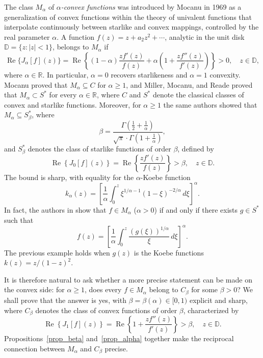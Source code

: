 \documentclass[reqno]{amsart}
\theoremstyle{plain}
\theoremstyle{definition}
\begin{document}
The class $M_\alpha$ of \textit{$\alpha$-convex functions} was introduced by Mocanu \cite{Moc1969} in 1969 as a generalization of convex functions within the theory of univalent functions that interpolate continuously between starlike and convex mappings, controlled by the real parameter $\alpha$. A function $f(z) = z + a_2z^2 + \cdots$, analytic in the unit disk $\mathbb{D} = \{z : |z| < 1\}$, belongs to $M_\alpha$ if
\begin{equation}\label{eq:a-convex}
\operatorname{Re}\{J_\alpha[f](z)\} = \operatorname{Re}\left\{(1-\alpha)\frac{zf'(z)}{f(z)} + \alpha\left(1 + \frac{zf''(z)}{f'(z)}\right)\right\} > 0, \quad z \in \mathbb{D},
\end{equation}
where $\alpha \in \mathbb{R}$. In particular, $\alpha = 0$ recovers starlikeness and $\alpha = 1$ convexity. Mocanu proved that $M_\alpha \subseteq C$ for $\alpha \geq 1$, and Miller, Mocanu, and Reade \cite{MMR1978} proved that $M_\alpha \subset S^*$ for every $\alpha \in \mathbb{R}$, where $C$ and $S^*$ denote the classical classes of
convex and starlike functions. Moreover, for $\alpha \geq 1$ the same authors showed that $M_\alpha \subseteq S^*_\beta$, where
\[\beta = \frac{\Gamma\!\left(\frac{1}{2}+\frac{1}{\alpha}\right)}{\sqrt{\pi}\cdot
\Gamma\!\left(1+\frac{1}{\alpha}\right)},\]
and $S^*_\beta$ denotes the class of starlike functions of order $\beta$,
defined by
\[\operatorname{Re}\left\{J_0[f](z)\right\} = \operatorname{Re}\left\{\frac{zf'(z)}{f(z)}\right\} > \beta, \quad z \in \mathbb{D}.\]
The bound is sharp, with equality for the $\alpha$-Koebe function
\begin{equation}\label{koebeconvex}
k_\alpha(z) = \left[\frac{1}{\alpha}\int_0^z \xi^{1/\alpha-1}(1-\xi)^{-2/\alpha}\,
d\xi\right]^{\alpha}.
\end{equation}
In fact, the authors in \cite{MMR1974} show that $f\in M_\alpha$ ($\alpha>0$) if and only if there exists $g\in S^*$ such that
\begin{equation}\label{rep_int}
    f(z)=\left[\dfrac{1}{\alpha}\int_0^z\dfrac{(g(\xi))^{1/\alpha}}{\xi}\,d\xi\right]^\alpha.
\end{equation}
The previous example holds when $g(z)$ is the Koebe functions $k(z)=z/(1-z)^2$.

It is therefore natural to ask whether a more precise statement can be made on the convex side: for $\alpha \geq 1$, does every $f \in M_\alpha$ belong to $C_\beta$ for some $\beta > 0$? We shall prove that the answer is yes, with $\beta = \beta(\alpha) \in [0,1)$ explicit and sharp, where $C_\beta$ denotes the class of convex functions of order $\beta$, characterized
by
\[\operatorname{Re}\left\{J_1[f](z)\right\} = \operatorname{Re}\left\{1 +
\frac{zf''(z)}{f'(z)}\right\} > \beta, \quad z \in \mathbb{D}.\]
Propositions~\ref{prop_beta} and~\ref{prop_alpha} together make the reciprocal connection between $M_\alpha$ and $C_\beta$ precise.
\end{document}

